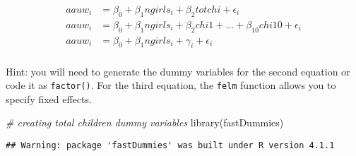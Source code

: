 \documentclass[
]{article}
\newenvironment{Shaded}{\begin{snugshade}}{\end{snugshade}}
\newcommand{\CommentTok}[1]{\textcolor[rgb]{0.56,0.35,0.01}{\textit{#1}}}
\newcommand{\FunctionTok}[1]{\textcolor[rgb]{0.00,0.00,0.00}{#1}}
\newcommand{\NormalTok}[1]{#1}
\newcommand{\SpecialCharTok}[1]{\textcolor[rgb]{0.00,0.00,0.00}{#1}}
\begin{document}
\[
\begin{aligned}
 aauw_i&=\beta_0+\beta_1ngirls_i+\beta_2totchi+\epsilon_i\\
  aauw_i&=\beta_0+\beta_1ngirls_i+\beta_2chi1+...+\beta_{10}chi10 +\epsilon_i\\
    aauw_i&=\beta_0+\beta_1ngirls_i+\gamma_i+\epsilon_i\\
\end{aligned}
\]

Hint: you will need to generate the dummy variables for the second
equation or code it as \texttt{factor()}. For the third equation, the
\texttt{felm} function allows you to specify fixed effects.

\begin{Shaded}
\begin{Highlighting}[]
\CommentTok{\# creating total children dummy variables}
\FunctionTok{library}\NormalTok{(fastDummies)}
\end{Highlighting}
\end{Shaded}

\begin{verbatim}
## Warning: package 'fastDummies' was built under R version 4.1.1
\end{verbatim}

\begin{Shaded}
\end{Shaded}
\end{document}
